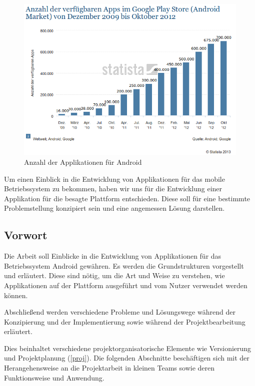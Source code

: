 \begin{figure}[h!t]
\begin{center}
\includegraphics[scale=0.6]{images/androidmarket}
\caption{Anzahl der Applikationen für Android}
\label{androidmarket}
\end{center}
\end{figure}

Um einen Einblick in die Entwicklung von Applikationen für das mobile Betriebssystem zu bekommen, haben wir uns für die Entwicklung einer Applikation für die besagte Plattform entschieden. Diese soll für eine bestimmte Problemstellung konzipiert sein und eine angemessen Lösung darstellen.

\subsection{Vorwort}

Die Arbeit soll Einblicke in die Entwicklung von Applikationen für das Betriebssystem Android gewähren. Es werden die Grundstrukturen vorgestellt und erläutert. Diese sind nötig, um die Art und Weise zu verstehen, wie Applikationen auf der Plattform ausgeführt und vom Nutzer verwendet werden können.

Abschließend werden verschiedene Probleme und Lösungswege während der Konzipierung und der Implementierung sowie während der Projektbearbeitung erläutert.

Dies beinhaltet verschiedene projektorganisatorische Elemente wie Versionierung und Projektplanung (\ref{proj}). Die folgenden Abschnitte beschäftigen sich mit der Herangehensweise an die Projektarbeit in kleinen Teams sowie deren Funktionsweise und Anwendung.

